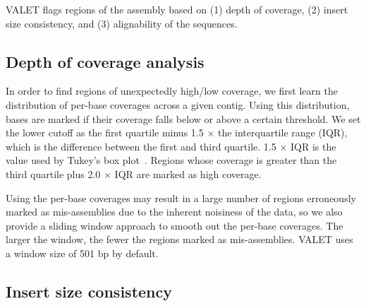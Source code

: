 \documentclass{bioinfo}
\begin{document}
VALET flags regions of the assembly based on (1) depth of coverage, (2) insert size consistency, and (3) alignability of the sequences.

\subsection{Depth of coverage analysis}

In order to find regions of unexpectedly high/low coverage, we first learn the distribution of per-base coverages across a given contig.  Using this distribution, bases are marked if their coverage falls below or above a certain threshold.  We set the lower cutoff as the first quartile minus 1.5 $\times$ the interquartile range (IQR), which is the difference between the first and third quartile. 1.5 $\times$ IQR is the value used by Tukey’s box plot~\citep{mcgill1978variations}.  Regions whose coverage is greater than the third quartile plus 2.0 $\times$ IQR are marked as high coverage.

Using the per-base coverages may result in a large number of regions erroneously marked as mis-assemblies due to the inherent noisiness of the data, so we also provide a sliding window approach to smooth out the per-base coverages. The larger the window, the fewer the regions marked as mis-assemblies.
VALET uses a window size of 501 bp by default.

\subsection{Insert size consistency}

\end{document}
